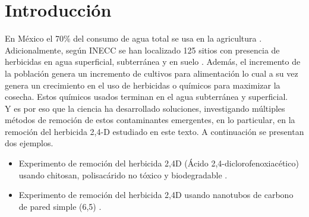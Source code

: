 \chapter{Introducción}


En México el 70\% del consumo de agua total se usa en la agricultura \cite{maguey2018}. Adicionalmente, según INECC se han localizado 125 sitios con presencia de herbicidas en agua superficial, subterránea y en suelo \cite{ineec2019}. Además, el incremento de la población genera un incremento de cultivos para alimentación lo cual a su vez genera un crecimiento en el uso de herbicidas o químicos para maximizar la cosecha. Estos químicos usados terminan en el agua subterránea y superficial.\\

Y es por eso que la ciencia ha desarrollado soluciones, investigando múltiples métodos de remoción de estos contaminantes emergentes, en lo particular, en la remoción del herbicida 2,4-D estudiado en este texto. A continuación se presentan dos ejemplos.

\begin{itemize}
    \item Experimento de remoción del herbicida 2,4D (Ácido 2,4-diclorofenoxiacético) usando chitosan, polisacárido no tóxico y biodegradable \cite{Nunes2019}.
    \item Experimento de remoción del herbicida 2,4D usando nanotubos de carbono de pared simple (6,5) \cite{rocha2017}.
\end{itemize}

